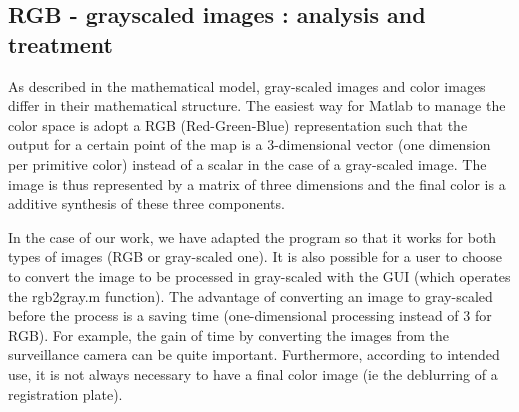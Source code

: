 \subsection{RGB - grayscaled images : analysis and treatment}

As described in the mathematical model, gray-scaled images and color images differ in their mathematical structure. The easiest way for Matlab to manage the color space is adopt a RGB (Red-Green-Blue) representation such that the output for a certain point of the map is a 3-dimensional vector (one dimension per primitive color) instead of a scalar in the case of a gray-scaled image. The image is thus represented by a matrix of three dimensions and the final color is a additive synthesis of these three components.
 
In the case of our work, we have adapted the program so that it works for both types of images (RGB or gray-scaled one). It is also possible for a user to choose to convert the image to be processed in gray-scaled with the GUI (which operates the rgb2gray.m function). The advantage of converting an image to gray-scaled before the process is a saving time (one-dimensional processing instead of 3 for RGB). For example, the gain of time by converting the images from the surveillance camera can be quite important. Furthermore, according to intended use, it is not always necessary to have a final color image (ie the deblurring of a registration plate).
